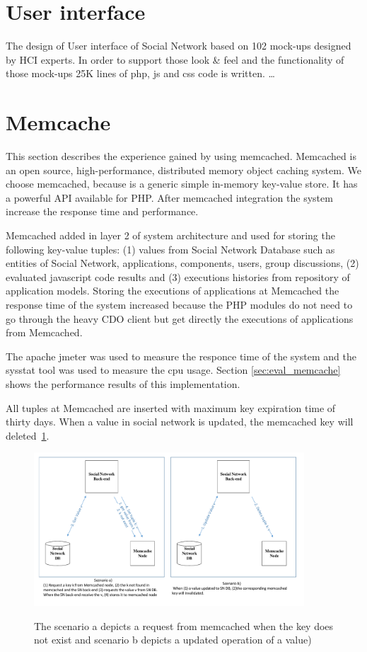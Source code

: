 \section{User interface}
The design of User interface of Social Network based on 102 mock-ups designed by HCI experts. In order to support those look \& feel and the functionality of those mock-ups 25K lines of php, js and css code is written. \ldots

\section{Memcache}
\label{sec:memcache_implementation}
This section describes the experience gained by using memcached\cite{memcache_url}. Memcached is an open source, high-performance, distributed memory object caching system. We choose memcached, because is a generic simple in-memory key-value store. It has a powerful API available for PHP. After memcached integration the system increase the response time and performance.

Memcached added in layer 2 of system architecture and used for storing the following key-value tuples: (1) values from Social Network Database such as entities of Social Network, applications, components, users, group discussions, (2) evaluated javascript code results and (3) executions histories from repository of application models. Storing the executions of applications at Memcached the response time of the system increased because the PHP modules do not need to go through the heavy CDO client but get directly the executions of applications from Memcached.

The apache jmeter\cite{jmeter_url} was used to measure the responce time of the system and the sysstat tool\cite{sysstat_url} was used to measure the cpu usage. Section \ref{sec:eval_memcache} 
 shows the performance results of this implementation.

All tuples at Memcached are inserted with maximum key expiration time of thirty days. When a value in social network is updated, the memcached key will deleted~\ref{fig:memcache_key_value}.

\begin{figure}[h]
	\caption{The scenario a depicts a request from memcached when the key does not exist and scenario b depicts a updated operation of a value) }
	\includegraphics[width=0.9\textwidth]{./fig/memcached_key_value.pdf}
	\centering
	\label{fig:memcache_key_value}
\end{figure}

